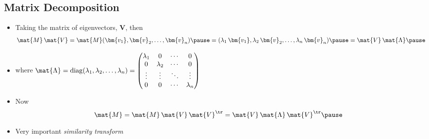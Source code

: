 \begin{slide}
\section[-2]{Matrix Decomposition}

\begin{PauseHighLight}
  \begin{itemize}
  \item Taking the matrix of eigenvectors, $\bm{V}$, then
    \begin{align*}
      \mat{M}\, \mat{V}  &= \mat{M} (\bm{v_1},\bm{v}_2,\ldots,\bm{v}_n)\pause
      =
      (\lambda_1\,\bm{v_1},\lambda_2\,\bm{v}_2,\ldots,\lambda_n\,\bm{v}_n)\pause
      = \mat{V} \,\mat{\Lambda}\pause
    \end{align*}
  \item where $\mat{\Lambda} = \mathrm{diag}(\lambda_1,
    \lambda_2,\ldots, \lambda_n) =
    \begin{pmatrix}
      \lambda_1 & 0 & \cdots & 0 \\
      0 & \lambda_2  & \cdots & 0 \\
      \vdots & \vdots &\ddots &\vdots \\
      0 & 0 & \cdots & \lambda_n
    \end{pmatrix}$\pause
  \item Now
    \begin{align*}
      \mat{M} = \mat{M}\, \mat{V} \, \mat{V}^\tr = \mat{V}
      \,\mat{\Lambda} \, \mat{V}^\tr \pause
    \end{align*}
  \item Very important \textit{similarity transform}\pause
  \end{itemize}
\end{PauseHighLight}

\end{slide}



